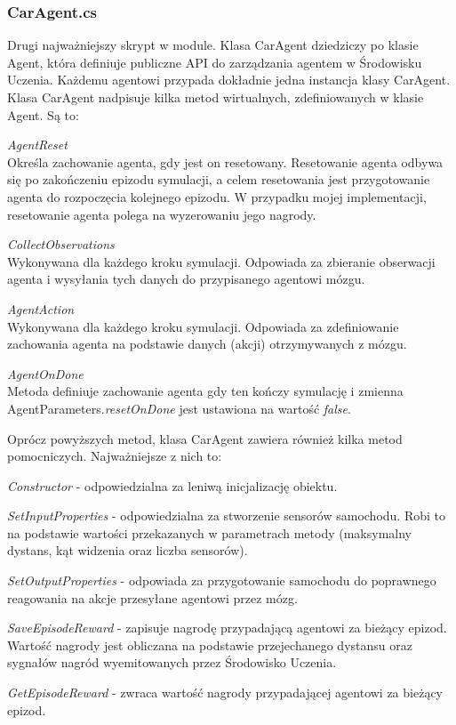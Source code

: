 \subsubsection{CarAgent.cs}
Drugi najważniejszy skrypt w module. Klasa CarAgent dziedziczy po klasie Agent, która definiuje publiczne API do zarządzania agentem w Środowisku Uczenia. Każdemu agentowi przypada dokładnie jedna instancja klasy CarAgent.
Klasa CarAgent nadpisuje kilka metod wirtualnych, zdefiniowanych w klasie Agent. Są to:
\begin{enumerate*}
\item \textit{AgentReset} \\
Określa zachowanie agenta, gdy jest on resetowany. Resetowanie agenta odbywa się po zakończeniu epizodu symulacji, a celem resetowania jest przygotowanie agenta do rozpoczęcia kolejnego epizodu. W przypadku mojej implementacji, resetowanie agenta polega na wyzerowaniu jego nagrody.
\item \textit{CollectObservations} \\
Wykonywana dla każdego kroku symulacji. Odpowiada za zbieranie obserwacji agenta i wysyłania tych danych do przypisanego  agentowi mózgu.
\item \textit{AgentAction} \\
Wykonywana dla każdego kroku symulacji. Odpowiada za zdefiniowanie zachowania agenta na podstawie danych (akcji) otrzymywanych z mózgu.
\item \textit{AgentOnDone} \\
Metoda definiuje zachowanie agenta gdy ten kończy symulację i zmienna AgentParameters.\textit{resetOnDone} jest ustawiona na wartość \textit{false}.
\end{enumerate*}

Oprócz powyższych metod, klasa CarAgent zawiera również kilka metod pomocniczych. Najważniejsze z nich to:
\begin{enumerate*}
\item \textit{Constructor} - odpowiedzialna za leniwą inicjalizację obiektu.
\item \textit{SetInputProperties} - odpowiedzialna za stworzenie sensorów samochodu. Robi to na podstawie wartości przekazanych w parametrach metody (maksymalny dystans, kąt widzenia oraz liczba sensorów).
\item \textit{SetOutputProperties} - odpowiada za przygotowanie samochodu do poprawnego reagowania na akcje przesyłane agentowi przez mózg.
\item \textit{SaveEpisodeReward} - zapisuje nagrodę przypadającą agentowi za bieżący epizod. Wartość nagrody jest obliczana na podstawie przejechanego dystansu oraz sygnałów nagród wyemitowanych przez Środowisko Uczenia.
\item \textit{GetEpisodeReward} - zwraca wartość nagrody przypadającej agentowi za bieżący epizod.
\end{enumerate*}

